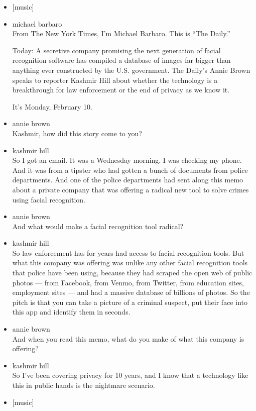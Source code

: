 \begin{itemize}
\item
  {[}music{]}
\item
  michael barbaro\\
  From The New York Times, I'm Michael Barbaro. This is ``The Daily.''

  Today: A secretive company promising the next generation of facial
  recognition software has compiled a database of images far bigger than
  anything ever constructed by the U.S. government. The Daily's Annie
  Brown speaks to reporter Kashmir Hill about whether the technology is
  a breakthrough for law enforcement or the end of privacy as we know
  it.

  It's Monday, February 10.
\item
  annie brown\\
  Kashmir, how did this story come to you?
\item
  kashmir hill\\
  So I got an email. It was a Wednesday morning. I was checking my
  phone. And it was from a tipster who had gotten a bunch of documents
  from police departments. And one of the police departments had sent
  along this memo about a private company that was offering a radical
  new tool to solve crimes using facial recognition.
\item
  annie brown\\
  And what would make a facial recognition tool radical?
\item
  kashmir hill\\
  So law enforcement has for years had access to facial recognition
  tools. But what this company was offering was unlike any other facial
  recognition tools that police have been using, because they had
  scraped the open web of public photos --- from Facebook, from Venmo,
  from Twitter, from education sites, employment sites --- and had a
  massive database of billions of photos. So the pitch is that you can
  take a picture of a criminal suspect, put their face into this app and
  identify them in seconds.
\item
  annie brown\\
  And when you read this memo, what do you make of what this company is
  offering?
\item
  kashmir hill\\
  So I've been covering privacy for 10 years, and I know that a
  technology like this in public hands is the nightmare scenario.
\item
  {[}music{]}\\

\end{itemize}
